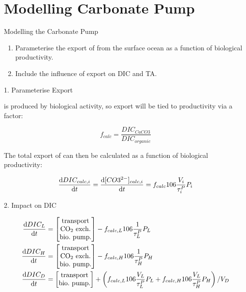 \section{Modelling Carbonate Pump}

\begin{frame}{Modelling the Carbonate Pump}

    \begin{enumerate}
        \item Parameterise the export of \ce{[CO3^{2-}]} from the surface ocean as a function of biological productivity.
        \item Include the influence of \ce{[CO3^{2-}]} export on DIC and TA.
    \end{enumerate}

\end{frame}


\begin{frame}{1. Parameterise  Export}

     is produced by biological activity, so export will be tied to productivity via a factor:

    $$
    f_{calc} = \frac{DIC_{CaCO3}}{DIC_{organic}}
    $$

    The total export of \ce{[CO3^{2-}]} can then be calculated as a function of biological productivity:

    $$
    \dv{DIC_{calc, i}}{t} = \dv{\ce[CO3^{2-}]_{calc, i}}{t} = f_{calc} 106 \frac{V_i}{\tau^P_i} P_i
    $$

\end{frame}

\begin{frame}{2. Impact on DIC}

    \begin{align*}
        \frac{\mathrm{d}DIC_L}{\mathrm{d}t} &= \begin{bmatrix} \mathrm{transport} \\ \mathrm{CO_2~exch.} \\ \mathrm{bio.~pump.} \end{bmatrix} - f_{calc,L} 106 \frac{1}{\tau^P_L} P_L \\
        \frac{\mathrm{d}DIC_H}{\mathrm{d}t} &= \begin{bmatrix} \mathrm{transport} \\ \mathrm{CO_2~exch.} \\ \mathrm{bio.~pump.} \end{bmatrix} - f_{calc,H} 106 \frac{1}{\tau^P_H} P_H \\
        \frac{\mathrm{d}DIC_D}{\mathrm{d}t} &= \begin{bmatrix} \mathrm{transport} \\ \mathrm{bio.~pump.} \end{bmatrix} + \left(f_{calc,L} 106 \frac{V_L}{\tau^P_L} P_L + f_{calc,H} 106 \frac{V_L}{\tau^P_H} P_H \right) / V_D
    \end{align*}

\end{frame}

